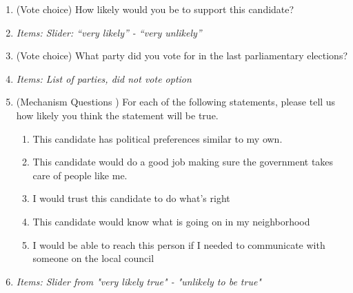 \documentclass[12pt]{article}
\newcommand{\alerta}[1]{\textcolor{harvardcrimson}{#1}}
\begin{document}
\begin{enumerate}
   \item \alerta{(Vote choice)}  How likely would you be to support this candidate?
    \item[] \textit{Items: Slider: ``very likely'' - ``very unlikely''}
    
    \item \alerta{(Vote choice)}  What party did you vote for in the last parliamentary elections?
    \item[] \textit{Items: List of parties, did not vote option}
    
    \item \alerta{(Mechanism Questions
)} For each of the following statements, please tell us how likely you think the statement will be true.
    \begin{enumerate}
        \item This candidate has political preferences similar to my own.
        \item This candidate would do a good job making sure the government takes care of people like me.
        \item I would trust this candidate to do what's right
        \item This candidate would know what is going on in my neighborhood
        \item I would be able to reach this person if I needed to communicate with someone on the local council
    \end{enumerate}
    
    \item[] \textit{Items: Slider from "very likely true" - "unlikely to be true"}

\end{enumerate}
\end{document}
